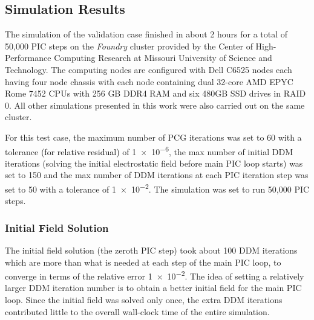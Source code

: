 \documentclass{siamart171218}
\newcommand{\coloring}[1]{\textcolor{black}{#1}} %
\begin{document}
\subsection{Simulation Results}

The simulation of the validation case finished in about 2 hours
for a total of 50,000 PIC steps
on the \emph{Foundry} cluster provided
by the Center of High-Performance Computing Research
at Missouri University of Science and Technology.
The computing nodes are configured with
Dell C6525 nodes each having
four node chassis with each node containing dual 32-core AMD EPYC Rome 7452 CPUs
with 256 GB DDR4 RAM and six 480GB SSD drives in RAID 0.
All other simulations presented in this work
were also carried out on the same cluster.


For this test case, the maximum number of PCG iterations was set to
60  with a tolerance \coloring{(for relative residual)} of \num{1e-6},
the max number of initial DDM iterations
(solving the initial electrostatic field before main PIC loop starts)
was set to 150
and the max number of DDM iterations at each PIC iteration step was set to
50 with a tolerance of \num{1e-2}.
The simulation was set to run 50,000 PIC steps.

\subsubsection{Initial Field Solution}
The initial field solution (the zeroth PIC step)
took about 100 DDM iterations which are more than
what is needed at each step of the main PIC loop,
to converge in terms of the relative error \num{1e-2}.
The idea of setting a relatively larger DDM iteration number
is to obtain a better initial field for the main PIC loop.
Since the initial field was solved only once,
the extra DDM iterations contributed little to the overall wall-clock time
of the entire simulation.
\end{document}
